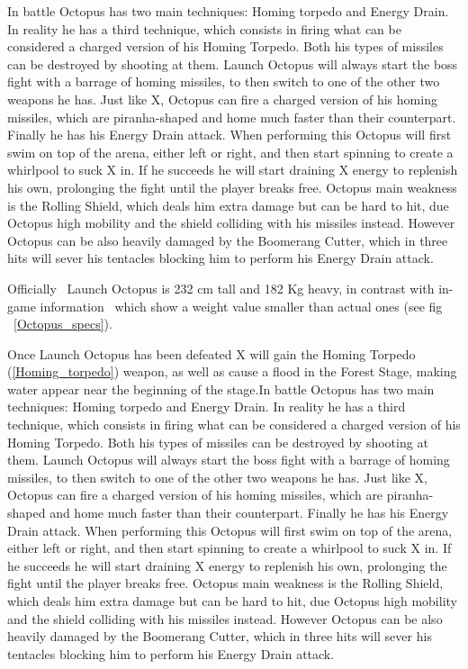 In battle Octopus has two main techniques: Homing torpedo and Energy Drain. In reality he has a third technique, which consists in firing what can be considered a charged version of his Homing Torpedo. Both his types of missiles can be destroyed by shooting at them. Launch Octopus will always start the boss fight with a barrage of homing missiles, to then  switch to one of the other two weapons he has. Just like X, Octopus can fire a charged version of his homing missiles, which are piranha-shaped and home much faster than their counterpart. Finally he has his Energy Drain attack. When performing this Octopus will first swim on top of the arena, either left or right, and then start spinning to create a whirlpool to suck X in. If he succeeds he will start draining X energy to replenish his own, prolonging the fight until the player breaks free. Octopus main weakness is the Rolling Shield, which deals him extra damage but can be hard to hit, due Octopus high mobility and the shield colliding with his missiles instead. However Octopus can be also heavily damaged by the Boomerang Cutter, which in three hits will sever his tentacles blocking him to perform his Energy Drain attack. 


Officially~\cite{wayback:X_resources} Launch Octopus is 232 cm tall and 182 Kg heavy, in contrast with in-game information~\cite{wiki:Launch_octopus} which show a weight value smaller than actual ones (see fig ~\ref{Octopus_specs}).

Once Launch Octopus has been defeated X will gain the Homing Torpedo (\ref{Homing_torpedo}) weapon, as well as cause a flood in the Forest Stage, making water appear near the beginning of the stage.In battle Octopus has two main techniques: Homing torpedo and Energy Drain. In reality he has a third technique, which consists in firing what can be considered a charged version of his Homing Torpedo. Both his types of missiles can be destroyed by shooting at them. Launch Octopus will always start the boss fight with a barrage of homing missiles, to then  switch to one of the other two weapons he has. Just like X, Octopus can fire a charged version of his homing missiles, which are piranha-shaped and home much faster than their counterpart. Finally he has his Energy Drain attack. When performing this Octopus will first swim on top of the arena, either left or right, and then start spinning to create a whirlpool to suck X in. If he succeeds he will start draining X energy to replenish his own, prolonging the fight until the player breaks free. Octopus main weakness is the Rolling Shield, which deals him extra damage but can be hard to hit, due Octopus high mobility and the shield colliding with his missiles instead. However Octopus can be also heavily damaged by the Boomerang Cutter, which in three hits will sever his tentacles blocking him to perform his Energy Drain attack. 


